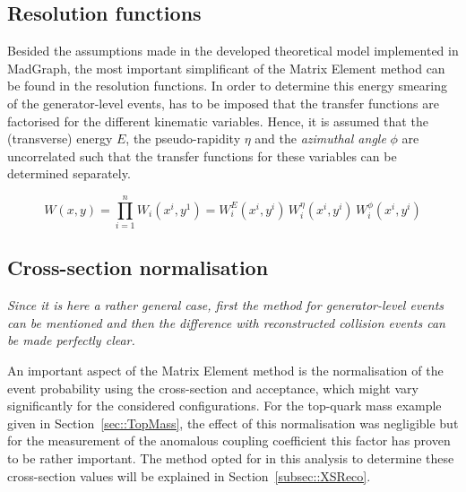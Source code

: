 \subsection{Resolution functions} \label{subsec::TF}

Besided the assumptions made in the developed theoretical model implemented in MadGraph, the most important simplificant of the Matrix Element method can be found in the resolution functions.
In order to determine this energy smearing of the generator-level events, has to be imposed that the transfer functions are factorised for the different kinematic variables.
Hence, it is assumed that the (transverse) energy $E$, the pseudo-rapidity $\eta$ and the \textit{azimuthal angle} $\phi$ are uncorrelated such that the transfer functions for these variables can be determined separately.

\begin{equation}
 W(x,y) = \prod_{i=1}^{n} W_{i}(x^{i},y^{1}) = W_{i}^{E}(x^{i},y^i) \, W_{i}^{\eta}(x^i, y^i) \, W_{i}^{\phi}(x^i,y^i)
\end{equation}

\subsection{Cross-section  normalisation}
\textit{Since it is here a rather general case, first the method for generator-level events can be mentioned and then the difference with reconstructed collision events can be made perfectly clear.}

An important aspect of the Matrix Element method is the normalisation of the event probability using the cross-section and acceptance, which might vary significantly for the considered configurations. For the top-quark mass example given in Section~\ref{sec::TopMass}, the effect of this normalisation was negligible but for the measurement of the anomalous coupling coefficient this factor has proven to be rather important. The method opted for in this analysis to determine these cross-section values will be explained in Section~\ref{subsec::XSReco}.

